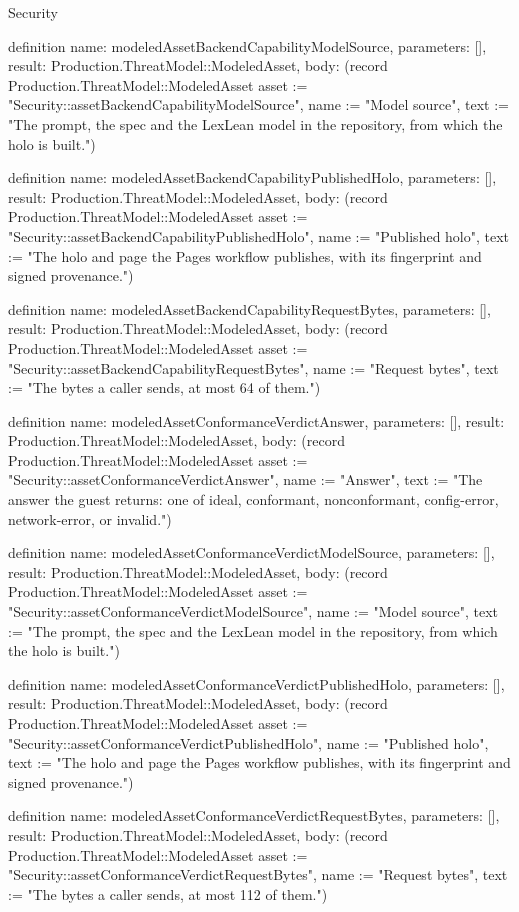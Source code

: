 \begin{lexlean}{Security}
\begin{semanticmodule}
definition{
  name: modeledAssetBackendCapabilityModelSource,
  parameters: [],
  result: Production.ThreatModel::ModeledAsset,
  body: (record Production.ThreatModel::ModeledAsset {asset := "Security::assetBackendCapabilityModelSource", name := "Model source", text := "The prompt, the spec and the LexLean model in the repository, from which the holo is built."})
}

definition{
  name: modeledAssetBackendCapabilityPublishedHolo,
  parameters: [],
  result: Production.ThreatModel::ModeledAsset,
  body: (record Production.ThreatModel::ModeledAsset {asset := "Security::assetBackendCapabilityPublishedHolo", name := "Published holo", text := "The holo and page the Pages workflow publishes, with its fingerprint and signed provenance."})
}

definition{
  name: modeledAssetBackendCapabilityRequestBytes,
  parameters: [],
  result: Production.ThreatModel::ModeledAsset,
  body: (record Production.ThreatModel::ModeledAsset {asset := "Security::assetBackendCapabilityRequestBytes", name := "Request bytes", text := "The bytes a caller sends, at most 64 of them."})
}

definition{
  name: modeledAssetConformanceVerdictAnswer,
  parameters: [],
  result: Production.ThreatModel::ModeledAsset,
  body: (record Production.ThreatModel::ModeledAsset {asset := "Security::assetConformanceVerdictAnswer", name := "Answer", text := "The answer the guest returns: one of ideal, conformant, nonconformant, config-error, network-error, or invalid."})
}

definition{
  name: modeledAssetConformanceVerdictModelSource,
  parameters: [],
  result: Production.ThreatModel::ModeledAsset,
  body: (record Production.ThreatModel::ModeledAsset {asset := "Security::assetConformanceVerdictModelSource", name := "Model source", text := "The prompt, the spec and the LexLean model in the repository, from which the holo is built."})
}

definition{
  name: modeledAssetConformanceVerdictPublishedHolo,
  parameters: [],
  result: Production.ThreatModel::ModeledAsset,
  body: (record Production.ThreatModel::ModeledAsset {asset := "Security::assetConformanceVerdictPublishedHolo", name := "Published holo", text := "The holo and page the Pages workflow publishes, with its fingerprint and signed provenance."})
}

definition{
  name: modeledAssetConformanceVerdictRequestBytes,
  parameters: [],
  result: Production.ThreatModel::ModeledAsset,
  body: (record Production.ThreatModel::ModeledAsset {asset := "Security::assetConformanceVerdictRequestBytes", name := "Request bytes", text := "The bytes a caller sends, at most 112 of them."})
}


\end{semanticmodule}
\end{lexlean}
